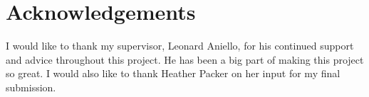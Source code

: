 \section*{Acknowledgements}

I would like to thank my supervisor, Leonard Aniello, for his continued support and advice throughout this project. He has been a big part of making this project so great. I would also like to thank Heather Packer on her input for my final submission.